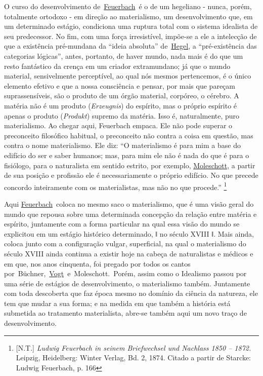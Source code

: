 O curso do desenvolvimento
de~\href{https://www.marxists.org/portugues/dicionario/verbetes/f/feuerbach.htm}{Feuerbach}~é
o de um hegeliano - nunca, porém, totalmente ortodoxo - em direção ao
materialismo, um desenvolvimento que, em um determinado estágio,
condiciona uma ruptura total com o sistema idealista de seu predecessor.
No fim, com uma força irresistível, impõe-se a ele a intelecção de que a
existência pré-mundana da ``ideia absoluta''
de~\href{https://www.marxists.org/portugues/dicionario/verbetes/h/hegel.htm}{Hegel},
a ``pré-existência das categorias lógicas'', antes, portanto, de haver
mundo, nada mais é do que um resto fantástico da crença em um criador
extramundano; já que o mundo material, sensivelmente perceptível, ao
qual nós mesmos pertencemos, é o único elemento efetivo e que a nossa
consciência e pensar, por mais que pareçam suprassensíveis, são o
produto de um órgão material, corpóreo, o cérebro. A matéria não é um
produto (\emph{Erzeugnis}) do espírito, mas o próprio espírito é apenas
o produto (\emph{Produkt}) supremo da matéria. Isso é, naturalmente,
puro materialismo. Ao chegar aqui, Feuerbach empaca. Ele não pode
superar o preconceito filosófico habitual, o preconceito não contra a
coisa em questão, mas contra o nome materialismo. Ele diz: ``O
materialismo é para mim a base do edifício do ser e saber humanos; mas,
para mim ele não é nada do que é para o fisiólogo, para o naturalista em
sentido estrito, por exemplo,
\href{https://www.marxists.org/portugues/dicionario/verbetes/m/moleschott.htm}{Moleschott},
a partir de sua posição e profissão ele é necessariamente o próprio
edifício. No que precede concordo inteiramente com os materialistas, mas
não no que procede.'' \footnote{{[}N.T.{]} \emph{Ludwig Feuerbach in
  seinem Briefwechsel und Nachlass 1850 -- 1872.} Leipzig, Heidelberg:
  Winter Verlag, Bd. 2, 1874. Citado a partir de Starcke: Ludwig
  Feuerbach, p. 166}\protect\hypertarget{r13}{}{}

Aqui
\href{https://www.marxists.org/portugues/dicionario/verbetes/f/feuerbach.htm}{Feuerbach}~coloca
no mesmo saco o materialismo, que é uma visão geral do mundo que repousa
sobre uma determinada concepção da relação entre matéria e espírito,
juntamente com a forma particular na qual essa visão do mundo se
explicitou em um estágio histórico determinado, ǁ no século XVIII ǁ.
Mais ainda, coloca junto com a configuração vulgar, superficial, na qual
o materialismo do século XVIII ainda continua a existir hoje na cabeça
de naturalistas e médicos e em que, nos anos cinquenta, foi pregado por
todos os cantos
por~Büchner,~\href{https://www.marxists.org/portugues/dicionario/verbetes/v/vogt.htm}{Vogt}~e~Moleschott.\protect\hypertarget{r14}{}{}~Porém,
assim como o Idealismo passou por uma série de estágios de
desenvolvimento, o materialismo também. Juntamente com toda descoberta
que faz época mesmo no domínio da ciência da natureza, ele tem que mudar
a sua forma; e na medida em que também a história está submetida ao
tratamento materialista, abre-se também aqui um novo traço de
desenvolvimento.


